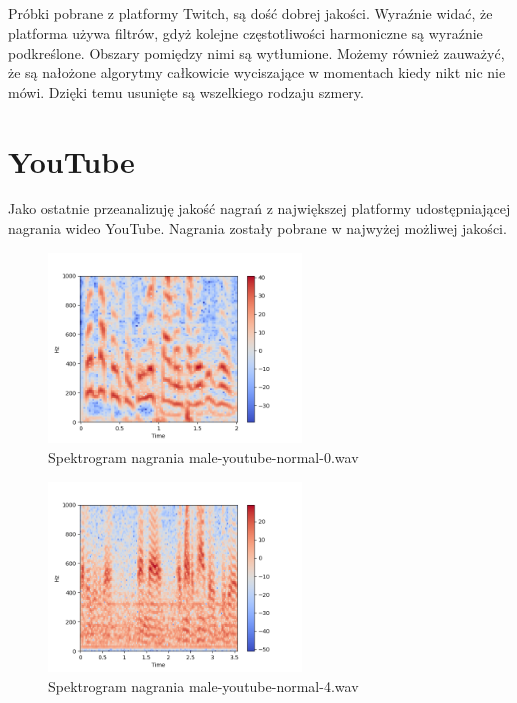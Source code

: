 \documentclass[a4paper,12pt]{extarticle}
\begin{document}
\newpage

\subsection*{}
Próbki pobrane z platformy Twitch, są dość dobrej jakości. Wyraźnie widać, że platforma używa filtrów, gdyż kolejne częstotliwości harmoniczne są wyraźnie podkreślone. Obszary pomiędzy nimi są wytłumione. Możemy również zauważyć, że są nałożone algorytmy całkowicie wyciszające w momentach kiedy nikt nic nie mówi. Dzięki temu usunięte są wszelkiego rodzaju szmery.

\newpage

\section*{YouTube}

Jako ostatnie przeanalizuję jakość nagrań z największej platformy udostępniającej nagrania wideo YouTube. Nagrania zostały pobrane w najwyżej możliwej jakości.

\begin{figure}[h]
\centering
\includegraphics[width=0.6\textwidth]{youtube-0}
\caption{Spektrogram nagrania male-youtube-normal-0.wav}
\end{figure}

\begin{figure}[h]
\centering
\includegraphics[width=0.6\textwidth]{youtube-1}
\caption{Spektrogram nagrania male-youtube-normal-4.wav}
\end{figure}
\end{document}

